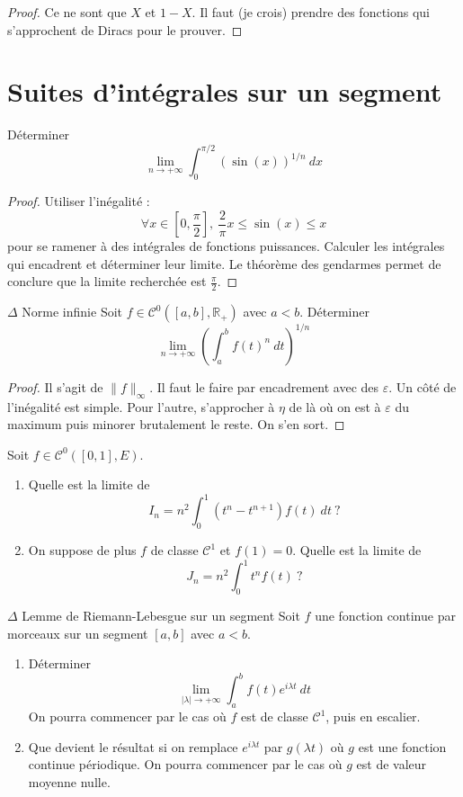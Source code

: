 \documentclass[french,a4paper]{article}
\newcommand{\R}{\mathbb{R}}
\theoremstyle{plain}
\theoremstyle{definition}
\theoremstyle{remark}
\begin{document}
\begin{proof}
	Ce ne sont que $X$ et $1-X$. Il faut (je crois) prendre des fonctions qui s'approchent de Diracs pour le prouver.
\end{proof}
\section{Suites d'intégrales sur un segment}

\begin{ex}[Moulin.IG.16]{}
	Déterminer $$\lim_{{n\to+\infty}}\int_{0}^{\pi/2}(\sin(x))^{1/n}\ dx$$
\end{ex}

\begin{proof}
	Utiliser l'inégalité :$$\forall x\in\left[0,\frac{\pi}{2}\right],\ \frac{2}{\pi}x\leqslant\sin(x)\leqslant x$$ pour se ramener à des intégrales de fonctions puissances. Calculer les intégrales qui encadrent et déterminer leur limite. Le théorème des gendarmes permet de conclure que la limite recherchée est $\displaystyle\frac{\pi}{2}$.
\end{proof}

\begin{ex}[Moulin.IG.17]{$\Delta$ Norme infinie}
	Soit $f\in\mathcal{C}^0([a,b],\R_+)$ avec $a<b$. Déterminer $$\lim_{n\to+\infty}\left(\int_{a}^{b}f(t)^{n}\ dt\right)^{1/n}$$
\end{ex}

\begin{proof}
	Il s'agit de $\lVert f\rVert_\infty$. Il faut le faire par encadrement avec des $\varepsilon$. Un côté de l'inégalité est simple. Pour l'autre, s'approcher à $\eta$ de là où on est à $\varepsilon$ du maximum puis minorer brutalement le reste. On s'en sort.
\end{proof}

\begin{ex}[Moulin.IG.18]{}
	Soit $f\in\mathcal{C}^0([0,1],E)$.
	\begin{enumerate}
		\item Quelle est la limite de $$I_n=\displaystyle n^2\int_{0}^{1}(t^n-t^{n+1})f(t)\ dt\ ?$$
		\item On suppose de plus $f$ de classe $\mathcal{C}^1$ et $f(1)=0$. Quelle est la limite de $$J_n=\displaystyle n^2\int_{0}^{1}t^nf(t)\ ?$$
	\end{enumerate}
\end{ex}

\begin{ex}[Moulin.IG.19]{$\Delta$ Lemme de Riemann-Lebesgue sur un segment}
	Soit $f$ une fonction continue par morceaux sur un segment $[a,b]$ avec $a<b$.
	\begin{enumerate}
		\item Déterminer $$\lim_{\lvert\lambda\rvert\to+\infty}\int_{a}^{b}f(t)e^{i\lambda t}\ dt$$ On pourra commencer par le cas où $f$ est de classe $\mathcal{C}^1$, puis en escalier.
		\item Que devient le résultat si on remplace $e^{i\lambda t}$ par $g(\lambda t)$ où $g$ est une fonction continue périodique. On pourra commencer par le cas où $g$ est de valeur moyenne nulle.
	\end{enumerate}
\end{ex}
\end{document}
